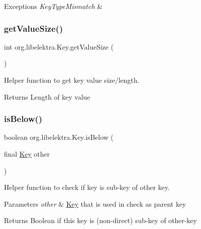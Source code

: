 \begin{DoxyExceptions}{Exceptions}
{\em Key\+Type\+Mismatch} & \\
\hline
\end{DoxyExceptions}
\mbox{\label{classorg_1_1libelektra_1_1Key_aeb1c3e899a17778c8511a08ee0472e43}} 
\subsubsection{\texorpdfstring{getValueSize()}{getValueSize()}}
{\footnotesize\ttfamily int org.\+libelektra.\+Key.\+get\+Value\+Size (\begin{DoxyParamCaption}{ }\end{DoxyParamCaption})\hspace{0.3cm}{\ttfamily [inline]}}



Helper function to get key value size/length. 

\begin{DoxyReturn}{Returns}
Length of key value 
\end{DoxyReturn}
\mbox{\label{classorg_1_1libelektra_1_1Key_af9a7a7941c07c058f1d4bd6c55e20fe9}} 
\subsubsection{\texorpdfstring{isBelow()}{isBelow()}}
{\footnotesize\ttfamily boolean org.\+libelektra.\+Key.\+is\+Below (\begin{DoxyParamCaption}\item[{final \mbox{\hyperlink{classorg_1_1libelektra_1_1Key}{Key}}}]{other }\end{DoxyParamCaption})\hspace{0.3cm}{\ttfamily [inline]}}



Helper function to check if key is sub-\/key of other key. 


\begin{DoxyParams}{Parameters}
{\em other} & \mbox{\hyperlink{classorg_1_1libelektra_1_1Key}{Key}} that is used in check as parent key \\
\hline
\end{DoxyParams}
\begin{DoxyReturn}{Returns}
Boolean if this key is (non-\/direct) sub-\/key of other-\/key 
\end{DoxyReturn}
\mbox{\label{classorg_1_1libelektra_1_1Key_ab3143b14824a384ec4b6f9005f6da554}} 
